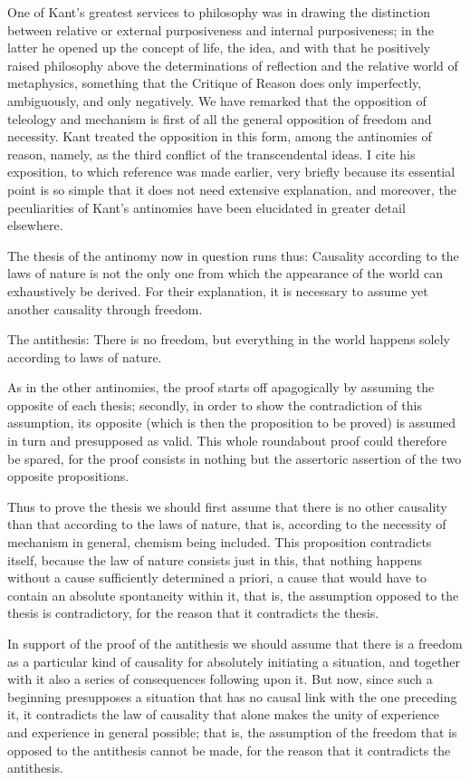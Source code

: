 One of Kant's greatest services to philosophy was
in drawing the distinction between relative or
external purposiveness and internal purposiveness;
in the latter he opened up the concept of life, the idea,
and with that he positively raised philosophy
above the determinations of reflection
and the relative world of metaphysics,
something that the Critique of Reason does
only imperfectly, ambiguously, and only negatively.
We have remarked that the opposition of teleology and mechanism is
first of all the general opposition of freedom and necessity.
Kant treated the opposition in this form, among the antinomies of reason,
namely, as the third conflict of the transcendental ideas.
I cite his exposition, to which reference was made earlier,
very briefly because its essential point is so simple
that it does not need extensive explanation,
and moreover, the peculiarities of Kant's antinomies
have been elucidated in greater detail elsewhere.

The thesis of the antinomy now in question runs thus:
Causality according to the laws of nature is
not the only one from which the appearance of
the world can exhaustively be derived.
For their explanation, it is necessary to
assume yet another causality through freedom.

The antithesis: There is no freedom,
but everything in the world happens
solely according to laws of nature.

As in the other antinomies, the proof starts off apagogically
by assuming the opposite of each thesis;
secondly, in order to show the contradiction of this assumption,
its opposite (which is then the proposition to be proved)
is assumed in turn and presupposed as valid.
This whole roundabout proof could therefore be spared,
for the proof consists in nothing but the assertoric
assertion of the two opposite propositions.

Thus to prove the thesis we should first assume
that there is no other causality than
that according to the laws of nature, that is,
according to the necessity of mechanism in general,
chemism being included.
This proposition contradicts itself,
because the law of nature consists just in this,
that nothing happens without a cause sufficiently determined a priori,
a cause that would have to contain an absolute spontaneity within it,
that is, the assumption opposed to the thesis is contradictory,
for the reason that it contradicts the thesis.

In support of the proof of the antithesis
we should assume that there is a freedom
as a particular kind of causality
for absolutely initiating a situation,
and together with it also a series of
consequences following upon it.
But now, since such a beginning presupposes
a situation that has no causal link with the one preceding it,
it contradicts the law of causality that alone makes the unity
of experience and experience in general possible;
that is, the assumption of the freedom
that is opposed to the antithesis cannot be made,
for the reason that it contradicts the antithesis.

